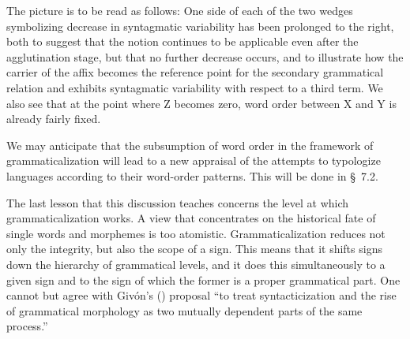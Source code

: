 The picture is to be read as follows: One side of each of the two wedges symbolizing decrease in syntagmatic variability has been prolonged to the right, both to suggest that the notion continues to be applicable even after the agglutination stage, but that no further decrease occurs, and to illustrate how the carrier of the affix becomes the reference point for the secondary grammatical relation and exhibits syntagmatic variability with respect to a third term. We also see that at the point where Z becomes zero, word order between X and Y is already fairly fixed.



We may anticipate that the subsumption of word order in the framework of grammaticalization will lead to a new appraisal of the attempts to typologize languages according to their word-order patterns. This will be done in §~7.2.

The last lesson that this discussion teaches concerns the level at which grammaticalization works. A view that concentrates on the historical fate of single words and morphemes is too atomistic. Grammaticalization reduces not only the integrity, but also the scope of a sign. This means that it shifts signs down the hierarchy of grammatical levels, and it does this simultaneously to a given sign and to the sign of which the former is a proper grammatical part. One cannot but agree with Givón's (\citeyear[94]{Givón1979}) proposal “to treat syntacticization and the rise of grammatical morphology as two mutually dependent parts of the same process.”


